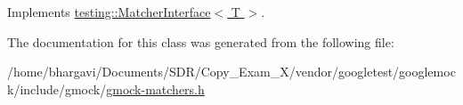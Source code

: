 Implements \hyperlink{classtesting_1_1_matcher_interface_a296b43607cd99d60365f0e6a762777cf}{testing\+::\+Matcher\+Interface$<$ T $>$}.



The documentation for this class was generated from the following file\+:\begin{DoxyCompactItemize}
\item 
/home/bhargavi/\+Documents/\+S\+D\+R/\+Copy\+\_\+\+Exam\+\_\+X/vendor/googletest/googlemock/include/gmock/\hyperlink{gmock-matchers_8h}{gmock-\/matchers.\+h}\end{DoxyCompactItemize}
